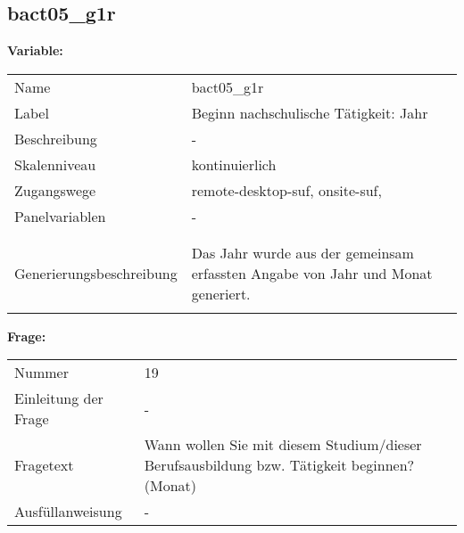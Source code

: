 	
	
	\subsection{bact05\_g1r}
	\label{subSection:bact05_g1r}

	\noindent\textbf{Variable:}\\
		\begin{tabular}{lL{11.3cm}}
			\label{tableVariable:bact05_g1r}
			Name & bact05\_g1r \\
			Label & Beginn nachschulische Tätigkeit: Jahr \\
			Beschreibung & - \\
			Skalenniveau & kontinuierlich \\
			Zugangswege &
				remote-desktop-suf,
				onsite-suf,
 \\
			Panelvariablen & -
			 \\
			 \\
 \\
					Generierungsbeschreibung & Das Jahr wurde aus der gemeinsam erfassten Angabe von Jahr und Monat generiert. 
				 \\	
			 \\
		\end{tabular}

		\vspace*{1 cm}
		\noindent\textbf{Frage:}\\
		\begin{tabular}{lL{11.3cm}}
			\label{tableQuestion:bact05_g1r}
			Nummer & 19 \\
			Einleitung der Frage & - \\
			Fragetext & Wann wollen Sie mit diesem Studium/dieser Berufsausbildung bzw. Tätigkeit beginnen? (Monat) \\
			Ausfüllanweisung & - \\
		\end{tabular}




